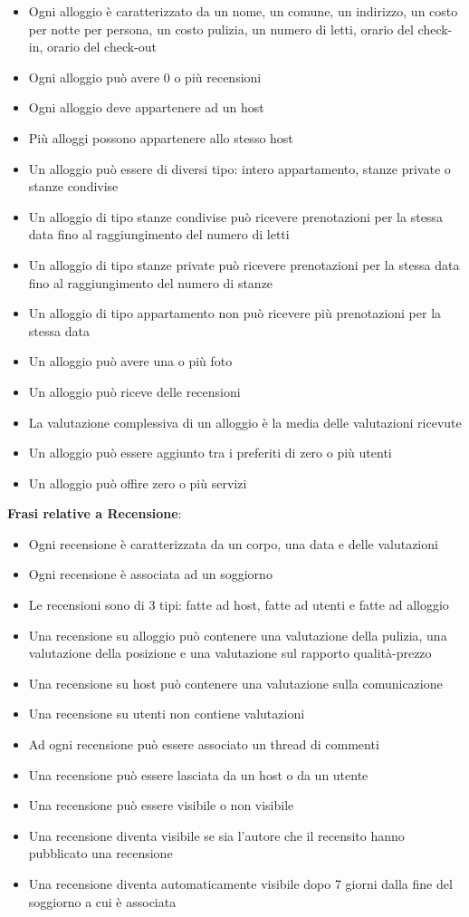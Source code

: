 \documentclass[letterpaper]{report}
\begin{document}
\begin{itemize}
    \item Ogni alloggio è caratterizzato da un nome, un comune, un indirizzo, un costo per notte per persona, un costo pulizia, un numero di letti, orario del check-in, orario del check-out
    \item Ogni alloggio può avere 0 o più recensioni
    \item Ogni alloggio deve appartenere ad un host
    \item Più alloggi possono appartenere allo stesso host
    \item Un alloggio può essere di diversi tipo: intero appartamento, stanze private o stanze condivise
    \item Un alloggio di tipo stanze condivise può ricevere prenotazioni per la stessa data fino al raggiungimento del numero di letti
    \item Un alloggio di tipo stanze private può ricevere prenotazioni per la stessa data fino al raggiungimento del numero di stanze
    \item Un alloggio di tipo appartamento non può ricevere più prenotazioni per la stessa data
    \item Un alloggio può avere una o più foto
    \item Un alloggio può riceve delle recensioni
    \item La valutazione complessiva di un alloggio è la media delle valutazioni ricevute
    \item Un alloggio può essere aggiunto tra i preferiti di zero o più utenti
    \item Un alloggio può offire zero o più servizi
\end{itemize}
\bigskip
\textbf{Frasi relative a Recensione}:
\begin{itemize}
    \item Ogni recensione è caratterizzata da un corpo, una data e delle valutazioni
    \item Ogni recensione è associata ad un soggiorno
    \item Le recensioni sono di 3 tipi: fatte ad host, fatte ad utenti e fatte ad alloggio
    \item Una recensione su alloggio può contenere una valutazione della pulizia, una valutazione della posizione e una valutazione sul rapporto qualità-prezzo
    \item Una recensione su host può contenere una valutazione sulla comunicazione
    \item Una recensione su utenti non contiene valutazioni
    \item Ad ogni recensione può essere associato un thread di commenti
    \item Una recensione può essere lasciata da un host o da un utente
    \item Una recensione può essere visibile o non visibile
    \item Una recensione diventa visibile se sia l'autore che il recensito hanno pubblicato una recensione
    \item Una recensione diventa automaticamente visibile dopo 7 giorni dalla fine del soggiorno a cui è associata
\end{itemize}
\end{document}
